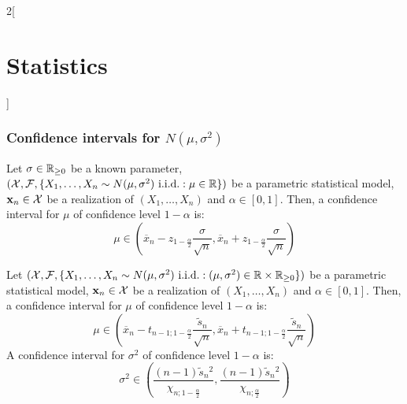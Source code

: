 \documentclass[../../../main_math.tex]{subfiles}
\begin{document}
\begin{multicols}{2}[\section{Statistics}]
  \subsubsection{Confidence intervals for \texorpdfstring{$N(\mu,\sigma^2)$}{N(mu,sigma2)}}
  \begin{proposition}
    Let $\sigma\in\mathbb{R}_{\geq 0}$ be a known parameter, $(\mathcal{X},\mathcal{F},\{X_1,\ldots,X_n\sim N(\mu,\sigma^2)\text{ i.i.d.}:\mu\in\mathbb{R}\})$ be a parametric statistical model, $\boldsymbol{\mathrm{x}}_n\in\mathcal{X}$ be a realization of $(X_1,\ldots,X_n)$ and $\alpha\in[0,1]$. Then, a confidence interval for $\mu$ of confidence level $1-\alpha$ is:
    $$\mu\in\left(\overline{x}_n-z_{1-\frac{\alpha}{2}}\frac{\sigma}{\sqrt{n}},\overline{x}_n+z_{1-\frac{\alpha}{2}}\frac{\sigma}{\sqrt{n}}\right)$$
  \end{proposition}
  \begin{proposition}
    Let $(\mathcal{X},\mathcal{F},\{X_1,\ldots,X_n\sim N(\mu,\sigma^2)\text{ i.i.d.}:(\mu,\sigma^2)\in\mathbb{R}\times\mathbb{R}_{\geq 0}\})$ be a parametric statistical model, $\boldsymbol{\mathrm{x}}_n\in\mathcal{X}$ be a realization of $(X_1,\ldots,X_n)$ and $\alpha\in[0,1]$. Then, a confidence interval for $\mu$ of confidence level $1-\alpha$ is:
    $$\mu\in\left(\overline{x}_n-t_{n-1;1-\frac{\alpha}{2}}\frac{\tilde{s}_n}{\sqrt{n}},\overline{x}_n+t_{n-1;1-\frac{\alpha}{2}}\frac{\tilde{s}_n}{\sqrt{n}}\right)$$
    A confidence interval for $\sigma^2$ of confidence level $1-\alpha$ is:
    $$\sigma^2\in\left(\frac{(n-1)\tilde{s}_n{}^2}{{\chi_{n;1-\frac{\alpha}{2}}}},\frac{(n-1)\tilde{s}_n{}^2}{{\chi_{n;\frac{\alpha}{2}}}}\right)$$
  \end{proposition}

\end{multicols}
\end{document}
